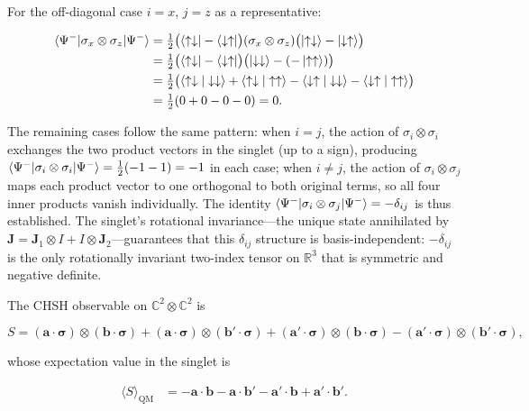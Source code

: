 For the off-diagonal case $i=x$, $j=z$ as a representative:
\begin{linenomath}
\begin{align}
\braket{\Psi^-|\sigma_x \otimes \sigma_z|\Psi^-}
&= \tfrac12\bigl(\bra{\uparrow\downarrow} - \bra{\downarrow\uparrow}\bigr)
(\sigma_x \otimes \sigma_z)
\bigl(\ket{\uparrow\downarrow} - \ket{\downarrow\uparrow}\bigr) \\
&= \tfrac12\bigl(\bra{\uparrow\downarrow} - \bra{\downarrow\uparrow}\bigr)
\bigl(\ket{\downarrow\downarrow} - (-\ket{\uparrow\uparrow})\bigr) \\
&= \tfrac12\bigl(\braket{\uparrow\downarrow|\downarrow\downarrow} + \braket{\uparrow\downarrow|\uparrow\uparrow}
- \braket{\downarrow\uparrow|\downarrow\downarrow} - \braket{\downarrow\uparrow|\uparrow\uparrow}\bigr) \\
&= \tfrac12(0 + 0 - 0 - 0) = 0.
\end{align}
\end{linenomath}
The remaining cases follow the same pattern: when $i=j$, the action of $\sigma_i\otimes\sigma_i$ exchanges the two product vectors in the singlet (up to a sign), producing $\braket{\Psi^-|\sigma_i\otimes\sigma_i|\Psi^-} = \tfrac12(-1 - 1) = -1$ in each case; when $i \neq j$, the action of $\sigma_i\otimes\sigma_j$ maps each product vector to one orthogonal to both original terms, so all four inner products vanish individually. The identity $\braket{\Psi^-|\sigma_i \otimes \sigma_j|\Psi^-} = -\delta_{ij}$ is thus established. The singlet's rotational invariance---the unique state annihilated by $\bm J = \bm J_1 \otimes I + I \otimes \bm J_2$---guarantees that this $\delta_{ij}$ structure is basis-independent: $-\delta_{ij}$ is the only rotationally invariant two-index tensor on $\mathbb{R}^3$ that is symmetric and negative definite.

The CHSH observable on $\mathbb{C}^2 \otimes \mathbb{C}^2$ is
\begin{linenomath}
\begin{equation}
S = (\bm a \cdot \bm \sigma) \otimes (\bm b \cdot \bm \sigma)
+ (\bm a \cdot \bm \sigma) \otimes (\bm b' \cdot \bm \sigma)
+ (\bm a' \cdot \bm \sigma) \otimes (\bm b \cdot \bm \sigma)
- (\bm a' \cdot \bm \sigma) \otimes (\bm b' \cdot \bm \sigma),
\label{eq:chsh-observable}
\end{equation}
\end{linenomath}
whose expectation value in the singlet is
\begin{linenomath}
\begin{align}
\langle S\rangle_{\text{QM}}
&= -\bm a\cdot\bm b - \bm a\cdot\bm b' - \bm a'\cdot\bm b + \bm a'\cdot\bm b'.
\end{align}
\end{linenomath}


